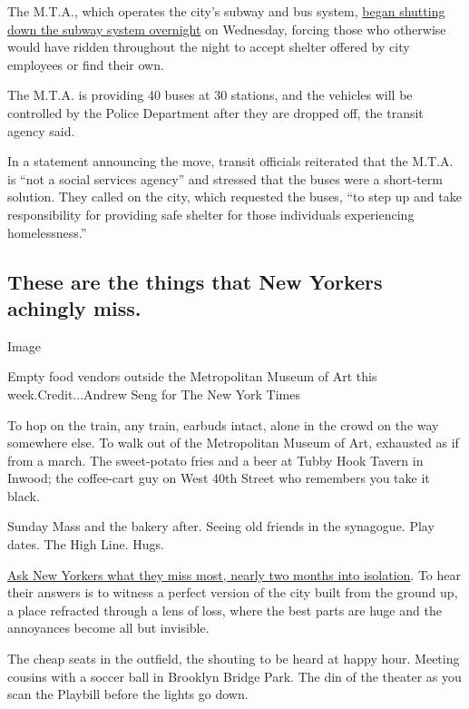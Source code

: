 The M.T.A., which operates the city's subway and bus system,
\href{https://www.nytimes3xbfgragh.onion/2020/05/06/nyregion/nyc-subway-close-coronavirus.html}{began
shutting down the subway system overnight} on Wednesday, forcing those
who otherwise would have ridden throughout the night to accept shelter
offered by city employees or find their own.

The M.T.A. is providing 40 buses at 30 stations, and the vehicles will
be controlled by the Police Department after they are dropped off, the
transit agency said.

In a statement announcing the move, transit officials reiterated that
the M.T.A. is ``not a social services agency'' and stressed that the
buses were a short-term solution. They called on the city, which
requested the buses, ``to step up and take responsibility for providing
safe shelter for those individuals experiencing homelessness.''

\hypertarget{these-are-the-things-that-new-yorkers-achingly-miss}{%
\subsection{These are the things that New Yorkers achingly
miss.}\label{these-are-the-things-that-new-yorkers-achingly-miss}}

Image

Empty food vendors outside the Metropolitan Museum of Art this
week.Credit...Andrew Seng for The New York Times

To hop on the train, any train, earbuds intact, alone in the crowd on
the way somewhere else. To walk out of the Metropolitan Museum of Art,
exhausted as if from a march. The sweet-potato fries and a beer at Tubby
Hook Tavern in Inwood; the coffee-cart guy on West 40th Street who
remembers you take it black.

Sunday Mass and the bakery after. Seeing old friends in the synagogue.
Play dates. The High Line. Hugs.

\href{https://www.nytimes3xbfgragh.onion/2020/05/09/nyregion/new-yorkers-missing-nyc-coronavirus.html}{Ask
New Yorkers what they miss most, nearly two months into isolation}. To
hear their answers is to witness a perfect version of the city built
from the ground up, a place refracted through a lens of loss, where the
best parts are huge and the annoyances become all but invisible.

The cheap seats in the outfield, the shouting to be heard at happy hour.
Meeting cousins with a soccer ball in Brooklyn Bridge Park. The din of
the theater as you scan the Playbill before the lights go down.

